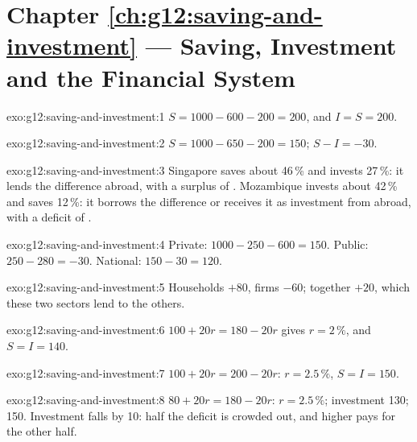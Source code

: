 \section*{Chapter \ref{ch:g12:saving-and-investment} --- Saving, Investment and the Financial System}

\begin{solution}{exo:g12:saving-and-investment:1}
$S = 1000 - 600 - 200 = 200$, and $I = S = 200$.
\end{solution}

\begin{solution}{exo:g12:saving-and-investment:2}
$S = 1000 - 650 - 200 = 150$;  $S - I = -30$.
\end{solution}

\begin{solution}{exo:g12:saving-and-investment:3}
Singapore saves about 46\,\% and invests 27\,\%: it lends the difference abroad, with a surplus of . Mozambique invests about 42\,\% and saves 12\,\%: it borrows the
difference or receives it as investment from abroad, with a deficit of .
\end{solution}

\begin{solution}{exo:g12:saving-and-investment:4}
Private: $1000 - 250 - 600 = 150$. Public: $250 - 280 = -30$. National: $150 - 30 = 120$.
\end{solution}

\begin{solution}{exo:g12:saving-and-investment:5}
Households $+80$, firms $-60$; together $+20$, which these two sectors lend to the others.
\end{solution}

\begin{solution}{exo:g12:saving-and-investment:6}
$100 + 20r = 180 - 20r$ gives $r = 2\,\%$, and $S = I = 140$.
\end{solution}

\begin{solution}{exo:g12:saving-and-investment:7}
$100 + 20r = 200 - 20r$: $r = 2.5\,\%$, $S = I = 150$.
\end{solution}

\begin{solution}{exo:g12:saving-and-investment:8}
 $80 + 20r = 180 - 20r$: $r = 2.5\,\%$; investment 130;  150. Investment falls by 10: half the deficit is crowded out, and higher 
pays for the other half.
\end{solution}

